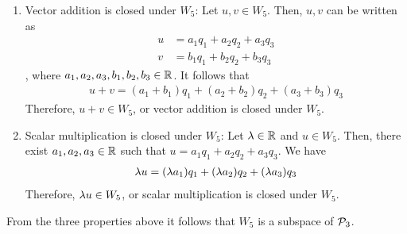 \begin{sol}
\begin{enumerate}[(i)]
\begin{enumerate}[(1)]
            \item Vector addition is closed under $W_5$: Let $u,v\in W_5$. Then, $u,v$ can be written as
            \[
                \begin{aligned}
                    u &= a_1q_1+a_2q_2+a_3q_3 \\
                    v &= b_1q_1+b_2q_2+b_3q_3
                \end{aligned}
            \]
            , where $a_1,a_2,a_3,b_1,b_2,b_3\in\R$. It follows that
            \[
                \begin{aligned}
                    u+v=(a_1+b_1)q_1+(a_2+b_2)q_2+(a_3+b_3)q_3
                \end{aligned}
            \] 
            Therefore, $u+v\in W_5$, or vector addition is closed under $W_5$.
            \item Scalar multiplication is closed under $W_5$: Let $\lam\in\R$ and $u\in W_5$. Then, there exist $a_1,a_2,a_3\in\R$ such that $u=a_1q_1+a_2q_2+a_3q_3$. We have
            \[
                \begin{aligned}
                    \lam u=(\lam a_1)q_1+(\lam a_2)q_2+(\lam a_3)q_3
                \end{aligned}
            \]
            Therefore, $\lam u\in W_5$, or scalar multiplication is closed under $W_5$.
        \end{enumerate}
        From the three properties above it follows that $W_5$ is a subspace of $\P_3$. 
    \end{enumerate}
\end{sol}